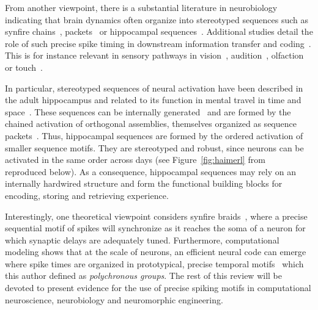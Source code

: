 \documentclass[brainsci, %
               review,submit,pdftex,moreauthors
               ]{Definitions/mdpi}
\begin{document}
From another viewpoint, there is a substantial literature in neurobiology indicating that brain dynamics often organize into stereotyped sequences such as synfire chains~\citep{ikegaya_synfire_2004}, packets~\citep{luczak_sequential_2007} or hippocampal sequences~\citep{pastalkova_internally_2008,villette_internally_2015}. Additional studies detail the role of such precise spike timing in downstream information transfer and coding~\citep{villette_internally_2015,branco_dendritic_2010,luczak_packet-based_2015}. This is for instance relevant in sensory pathways in vision~\citep{meister_concerted_1995}, audition~\citep{decharms_primary_1996}, olfaction~\citep{wehr_odour_1996} or touch~\citep{johansson_first_2004}. 

In particular, stereotyped sequences of neural activation have been described in the adult hippocampus and related to its function in mental travel in time and space~\citep{buzsaki_space_2018}. These sequences can be internally generated~\citep{pastalkova_internally_2008,villette_internally_2015} and are formed by the chained activation of orthogonal assemblies, themselves organized as sequence packets~\citep{malvache_awake_2016}. Thus, hippocampal sequences are formed by the ordered activation of smaller sequence motifs. They are stereotyped and robust, since neurons can be activated in the same order across days (see Figure~\ref{fig:haimerl} from~\citep{haimerl_internal_2019} reproduced below). As a consequence, hippocampal sequences may rely on an internally hardwired structure and form the functional building blocks for encoding, storing and retrieving experience.

Interestingly, one theoretical viewpoint considers synfire braids~\citep{bienenstock_model_1995}, where a precise sequential motif of spikes will synchronize as it reaches the soma of a neuron for which synaptic delays are adequately tuned. Furthermore, computational modeling shows that at the scale of neurons, an efficient neural code can emerge where spike times are organized in prototypical, precise temporal motifs~\citep{izhikevich_polychronization_2006} which this author defined as \emph{polychronous groups}. The rest of this review will be devoted to present evidence for the use of precise spiking motifs in computational neuroscience, neurobiology and neuromorphic engineering.
%
\end{document}
